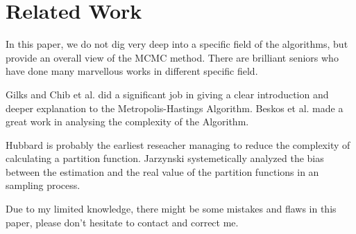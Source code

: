 
\section{Related Work} \label{sec:relatedwork}

In this paper, we do not dig very deep into a specific field of the algorithms, but provide an overall view of the MCMC method.
There are brilliant seniors who have done many marvellous works in different specific field.

Gilks\cite{gilks2005markov} and Chib et al.\cite{chib1995} did a significant job in giving a clear introduction and deeper explanation to the Metropolis-Hastings Algorithm. Beskos et al.\cite{beskos2009} made a great work in analysing the complexity of the Algorithm. 

Hubbard\cite{hubbard1959calculation} is probably the earliest reseacher managing to reduce the complexity of calculating a partition function. Jarzynski\cite{nonequilibrium} systemetically analyzed the bias between the estimation and the real value of the partition functions in an sampling process.

Due to my limited knowledge, there might be some mistakes and flaws in this paper, please don't hesitate to contact and correct me.